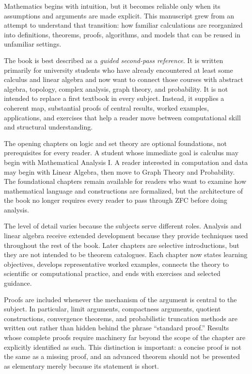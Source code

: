 \preface
\thispagestyle{empty}

Mathematics begins with intuition, but it becomes reliable only when its assumptions and arguments are made explicit. This manuscript grew from an attempt to understand that transition: how familiar calculations are reorganized into definitions, theorems, proofs, algorithms, and models that can be reused in unfamiliar settings.

The book is best described as a \emph{guided second-pass reference}. It is written primarily for university students who have already encountered at least some calculus and linear algebra and now want to connect those courses with abstract algebra, topology, complex analysis, graph theory, and probability. It is not intended to replace a first textbook in every subject. Instead, it supplies a coherent map, substantial proofs of central results, worked examples, applications, and exercises that help a reader move between computational skill and structural understanding.

The opening chapters on logic and set theory are optional foundations, not prerequisites for every reader. A student whose immediate goal is calculus may begin with Mathematical Analysis I. A reader interested in computation and data may begin with Linear Algebra, then move to Graph Theory and Probability. The foundational chapters remain available for readers who want to examine how mathematical language and constructions are formalized, but the architecture of the book no longer requires every reader to pass through ZFC before doing analysis.

The level of detail varies because the subjects serve different roles. Analysis and linear algebra receive extended development because they provide techniques used throughout the rest of the book. Later chapters are selective introductions, but they are not intended to be theorem catalogues. Each chapter now states learning objectives, develops representative worked examples, connects the theory to scientific or computational practice, and ends with exercises and selected guidance.

Proofs are included whenever the mechanism of the argument is central to the subject. In particular, limit arguments, compactness arguments, quotient constructions, convergence theorems, and probabilistic truncation methods are written out rather than hidden behind the phrase “standard proof.” Results whose complete proofs require machinery far beyond the scope of the chapter are explicitly identified as such. This distinction is important: a concise proof is not the same as a missing proof, and an advanced theorem should not be presented as elementary merely because its statement is short.

